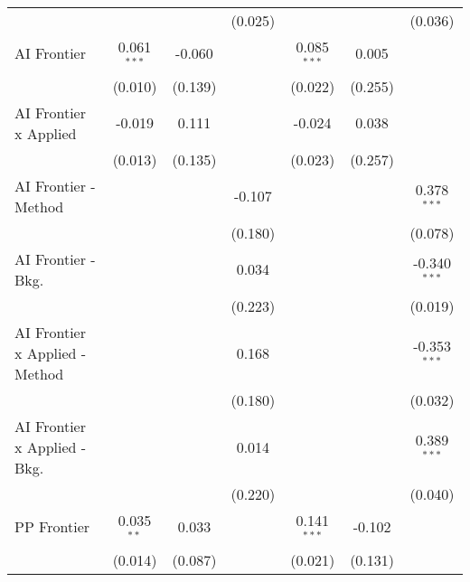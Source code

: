 \begin{tabular}{lcccccc}
                                  &                &                & (0.025)        &                &                & (0.036)\\   
   AI Frontier                    & 0.061$^{***}$  & -0.060         &                & 0.085$^{***}$  & 0.005          &   \\   
                                  & (0.010)        & (0.139)        &                & (0.022)        & (0.255)        &   \\   
   AI Frontier x Applied          & -0.019         & 0.111          &                & -0.024         & 0.038          &   \\   
                                  & (0.013)        & (0.135)        &                & (0.023)        & (0.257)        &   \\   
   AI Frontier - Method           &                &                & -0.107         &                &                & 0.378$^{***}$\\   
                                  &                &                & (0.180)        &                &                & (0.078)\\   
   AI Frontier - Bkg.             &                &                & 0.034          &                &                & -0.340$^{***}$\\   
                                  &                &                & (0.223)        &                &                & (0.019)\\   
   AI Frontier x Applied - Method &                &                & 0.168          &                &                & -0.353$^{***}$\\   
                                  &                &                & (0.180)        &                &                & (0.032)\\   
   AI Frontier x Applied - Bkg.   &                &                & 0.014          &                &                & 0.389$^{***}$\\   
                                  &                &                & (0.220)        &                &                & (0.040)\\   
   PP Frontier                    & 0.035$^{**}$   & 0.033          &                & 0.141$^{***}$  & -0.102         &   \\   
                                  & (0.014)        & (0.087)        &                & (0.021)        & (0.131)        &   \\   

\end{tabular}
